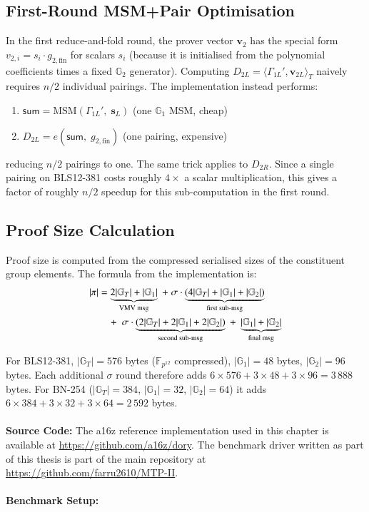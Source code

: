 \subsection{First-Round MSM+Pair Optimisation}

In the first reduce-and-fold round, the prover vector $\mathbf{v}_2$ has the
special form $v_{2,i} = s_i \cdot g_{2,\mathrm{fin}}$ for scalars $s_i$
(because it is initialised from the polynomial coefficients times a fixed
$\mathbb{G}_2$ generator). Computing $D_{2L} = \langle \Gamma_{1L}',
\mathbf{v}_{2L}\rangle_T$ naively requires $n/2$ individual pairings. The
implementation instead performs:
\begin{enumerate}
    \item $\mathsf{sum} = \mathrm{MSM}(\Gamma_{1L}',\; \mathbf{s}_L)$ \quad
          (one $\mathbb{G}_1$ MSM, cheap)
    \item $D_{2L} = e(\mathsf{sum},\; g_{2,\mathrm{fin}})$ \quad
          (one pairing, expensive)
\end{enumerate}
reducing $n/2$ pairings to one. The same trick applies to $D_{2R}$. Since a
single pairing on BLS12-381 costs roughly $4\times$ a scalar multiplication,
this gives a factor of roughly $n/2$ speedup for this sub-computation in the
first round.

\subsection{Proof Size Calculation}

Proof size is computed from the compressed serialised sizes of the constituent
group elements. The formula from the implementation is:
\begin{align}
    |\pi| &= \underbrace{2|\mathbb{G}_T| + |\mathbb{G}_1|}_{\text{VMV msg}}
    \;+\;
    \sigma\cdot\underbrace{(4|\mathbb{G}_T| + |\mathbb{G}_1| + |\mathbb{G}_2|)}_{\text{first sub-msg}}
    \notag\\
    &\quad+\;
    \sigma\cdot\underbrace{(2|\mathbb{G}_T| + 2|\mathbb{G}_1| + 2|\mathbb{G}_2|)}_{\text{second sub-msg}}
    \;+\;
    \underbrace{|\mathbb{G}_1| + |\mathbb{G}_2|}_{\text{final msg}}
\end{align}

For BLS12-381, $|\mathbb{G}_T| = 576$ bytes ($\mathbb{F}_{p^{12}}$
compressed), $|\mathbb{G}_1| = 48$ bytes, $|\mathbb{G}_2| = 96$ bytes. Each
additional $\sigma$ round therefore adds
$6\times576 + 3\times48 + 3\times96 = 3\,888$ bytes. For BN-254
($|\mathbb{G}_T| = 384$, $|\mathbb{G}_1| = 32$, $|\mathbb{G}_2| = 64$) it
adds $6\times384 + 3\times32 + 3\times64 = 2\,592$ bytes.
\\\\
\textbf{Source Code:}
The a16z reference implementation used in this chapter is available at
\url{https://github.com/a16z/dory}. The benchmark driver written as
part of this thesis is part of the main repository at
\url{https://github.com/farru2610/MTP-II}.
\\\\
\textbf{Benchmark Setup:}

